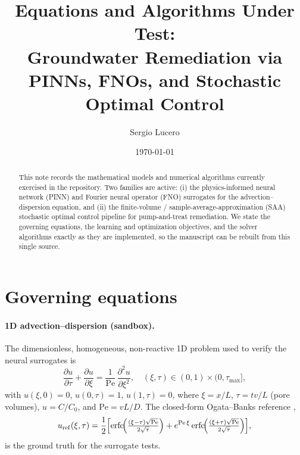 \documentclass[10pt]{article}
\title{\vspace{-1.2em}Equations and Algorithms Under Test:\\ Groundwater Remediation via PINNs, FNOs, and Stochastic Optimal Control}
\author{Sergio Lucero}
\date{\today}
\newcommand{\pdd}[2]{\frac{\partial #1}{\partial #2}}
\newcommand{\pddt}[2]{\frac{\partial^{2} #1}{\partial #2^{2}}}
\newcommand{\erfc}{\operatorname{erfc}}
\begin{document}
\maketitle
\vspace{-2.5em}

\begin{abstract}
\noindent This note records the mathematical models and numerical algorithms
currently exercised in the repository. Two families are active: (i) the
physics-informed neural network (PINN) and Fourier neural operator (FNO)
surrogates for the advection--dispersion equation, and (ii) the
finite-volume / sample-average-approximation (SAA) stochastic optimal control
pipeline for pump-and-treat remediation. We state the governing equations, the
learning and optimization objectives, and the solver algorithms exactly as
they are implemented, so the manuscript can be rebuilt from this single source.
\end{abstract}

\section{Governing equations}
\label{sec:pde}

\paragraph{1D advection--dispersion (sandbox).}
The dimensionless, homogeneous, non-reactive 1D problem used to verify the
neural surrogates is
\begin{equation}
\pdd{u}{\tau}+\pdd{u}{\xi}=\frac{1}{\mathrm{Pe}}\,\pddt{u}{\xi},
\quad (\xi,\tau)\in(0,1)\times(0,\tau_{\max}],
\label{eq:ade1d}
\end{equation}
with $u(\xi,0)=0$, $u(0,\tau)=1$, $u(1,\tau)=0$, where $\xi=x/L$,
$\tau=tv/L$ (pore volumes), $u=C/C_0$, and $\mathrm{Pe}=vL/D$. The
closed-form Ogata--Banks reference \cite{ogata1961solution},
\begin{equation}
u_{\mathrm{ref}}(\xi,\tau)=
\frac12\Bigl[
\erfc\!\Bigl(\tfrac{(\xi-\tau)\sqrt{\mathrm{Pe}}}{2\sqrt{\tau}}\Bigr)
+e^{\mathrm{Pe}\,\xi}\erfc\!\Bigl(\tfrac{(\xi+\tau)\sqrt{\mathrm{Pe}}}{2\sqrt{\tau}}\Bigr)
\Bigr],
\label{eq:ogata}
\end{equation}
is the ground truth for the surrogate tests.
\end{document}

